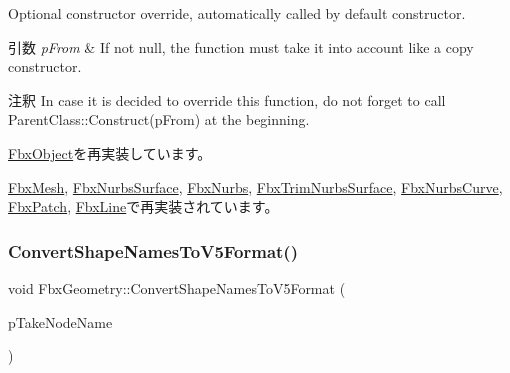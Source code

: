Optional constructor override, automatically called by default constructor. 
\begin{DoxyParams}{引数}
{\em p\+From} & If not null, the function must take it into account like a copy constructor. \\
\hline
\end{DoxyParams}
\begin{DoxyRemark}{注釈}
In case it is decided to override this function, do not forget to call Parent\+Class\+::\+Construct(p\+From) at the beginning. 
\end{DoxyRemark}


\hyperlink{class_fbx_object_a313503bc645af3fdceb4a99ef5cea7eb}{Fbx\+Object}を再実装しています。



\hyperlink{class_fbx_mesh_a230787ca87312437d427d9ec7c150565}{Fbx\+Mesh}, \hyperlink{class_fbx_nurbs_surface_a3487d194007af1729d31dc9dfa0b12c9}{Fbx\+Nurbs\+Surface}, \hyperlink{class_fbx_nurbs_a1d62f29d7315e343d5c0c414dab3fabb}{Fbx\+Nurbs}, \hyperlink{class_fbx_trim_nurbs_surface_a95ea54578a57e9038ae67cb2b6b26f82}{Fbx\+Trim\+Nurbs\+Surface}, \hyperlink{class_fbx_nurbs_curve_ac730e9ec1d56724f8495725b0491ddd8}{Fbx\+Nurbs\+Curve}, \hyperlink{class_fbx_patch_a82fbbc0a7ec019bbe69c976ab755b23e}{Fbx\+Patch}, \hyperlink{class_fbx_line_a42d7e3fb4684712df04464644abee11a}{Fbx\+Line}で再実装されています。

\mbox{\label{class_fbx_geometry_a2b135cea388e72bff364a6fa8714a38b}} 
\subsubsection{\texorpdfstring{Convert\+Shape\+Names\+To\+V5\+Format()}{ConvertShapeNamesToV5Format()}\hspace{0.1cm}{\footnotesize\ttfamily [1/2]}}
{\footnotesize\ttfamily void Fbx\+Geometry\+::\+Convert\+Shape\+Names\+To\+V5\+Format (\begin{DoxyParamCaption}\item[{\hyperlink{class_fbx_string}{Fbx\+String}}]{p\+Take\+Node\+Name }\end{DoxyParamCaption})}

\mbox{\label{class_fbx_geometry_aa1806aadaf07dac7d895e65f731f1679}} 
